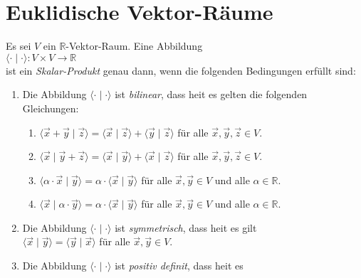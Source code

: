 \section{Euklidische Vektor-R\"{a}ume}
\begin{Definition} \lb
  Es sei $V$ ein $\mathbb{R}$-Vektor-Raum.  Eine Abbildung 
  \\[0.2cm]
  \hspace*{1.3cm}
  $\langle \cdot \mid \cdot \rangle: V \times V \rightarrow \mathbb{R}$
  \\[0.2cm]
  ist ein \emph{\color{blue}Skalar-Produkt} genau dann, wenn die folgenden Bedingungen erf\"{u}llt sind:
  \begin{enumerate}
  \item Die Abbildung $\langle \cdot\mid \cdot \rangle$ ist \emph{\color{blue}bilinear}, dass hei\3t es gelten die
        folgenden Gleichungen:
        \begin{enumerate}
        \item $\langle \vec{x} + \vec{y}\mid \vec{z} \rangle = \langle \vec{x}\mid \vec{z} \rangle + \langle \vec{y}\mid \vec{z} \rangle$
              \quad f\"{u}r alle $\vec{x}, \vec{y}, \vec{z} \in V$.
        \item $\langle \vec{x}\mid \vec{y} + \vec{z} \rangle = \langle \vec{x}\mid \vec{y} \rangle + \langle \vec{x}\mid \vec{z} \rangle$
              \quad f\"{u}r alle $\vec{x}, \vec{y}, \vec{z} \in V$.
        \item $\langle \alpha \cdot \vec{x}\mid \vec{y} \rangle = \alpha \cdot \langle \vec{x}\mid \vec{y} \rangle$
              \quad f\"{u}r alle $\vec{x}, \vec{y} \in V$ und alle $\alpha \in \mathbb{R}$.
        \item $\langle \vec{x}\mid \alpha \cdot \vec{y} \rangle = \alpha \cdot \langle \vec{x}\mid \vec{y} \rangle$
              \quad f\"{u}r alle $\vec{x}, \vec{y} \in V$ und alle $\alpha \in \mathbb{R}$.
        \end{enumerate}
  \item Die Abbildung  $\langle \cdot\mid \cdot \rangle$ ist \emph{\color{blue}symmetrisch}, dass hei\3t es gilt
        \\[0.2cm]
        \hspace*{1.3cm}
        $\langle \vec{x}\mid \vec{y} \rangle = \langle \vec{y}\mid \vec{x} \rangle$ 
        \quad f\"{u}r alle $\vec{x}, \vec{y} \in V$.
  \item Die Abbildung   $\langle \cdot\mid \cdot \rangle$ ist \emph{\color{blue}positiv definit}, dass hei\3t es

\end{enumerate}
\end{Definition}
